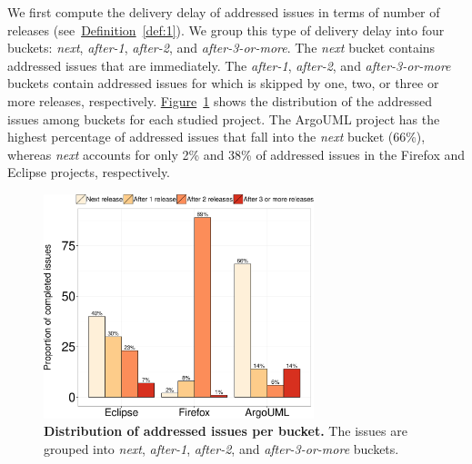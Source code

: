 We first compute the delivery delay of addressed issues in terms of number of
releases (see~\hyperref[def:1]{Definition}~\ref{def:1}). We group this type of
delivery delay into four buckets: \textit{next}, \textit{after-1},
\textit{after-2}, and \textit{after-3-or-more}. The \textit{next} bucket
contains addressed issues that are \DIFdelbegin {}\DIFdelend \DIFaddbegin {}\DIFaddend immediately. The \textit{after-1},
\textit{after-2}, and \textit{after-3-or-more} buckets contain addressed issues
for which \DIFdelbegin {}\DIFdelend \DIFaddbegin {}\DIFaddend is skipped by one, two, or three or more releases,
respectively.
\hyperref[ch4:fig:fixToIntegration]{Figure}~\ref{ch4:fig:fixToIntegration} shows
the distribution of the addressed issues among buckets for each studied project.
The ArgoUML project has the highest percentage of addressed issues that fall
into the \textit{next} bucket (66\%), whereas \textit{next} accounts for only
2\% and 38\% of addressed issues in the Firefox and Eclipse projects,
respectively. 

\begin{figure}
	\centering
	\includegraphics[width=0.7\textwidth]
	{chapters/chapter4/figures/CS_rq1-datasets.pdf}
	\caption{\textbf{Distribution of addressed issues per bucket.} The issues are
		grouped into \textit{next}, \textit{after-1}, \textit{after-2}, and
	\textit{after-3-or-more} buckets.}
	\label{ch4:fig:fixToIntegration}
\end{figure}

